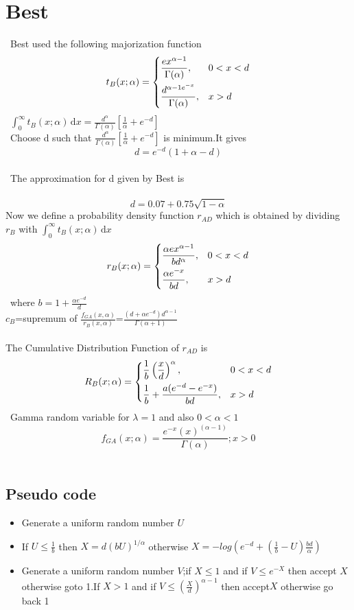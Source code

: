 \documentclass[11pt]{article}
\begin{document}
\section{Best}
\ Best used the following majorization function\\
\[
t_{B}(x;\alpha)=
\begin{dcases}
\frac{e x^{\alpha-1}}{\Gamma(\alpha)}, & 0<x<d \\
\frac{d^{\alpha-1e^{-x}}}{\Gamma(\alpha)}, & x>d
\end{dcases}
\]
\ $\int_0^\infty t_{B}(x;\alpha)\,\mathrm{d}x=\frac{d^{\alpha}}{\Gamma(\alpha)}\left[\frac{1}{\alpha}+e^{-d}\right]$\\
\ Choose d such that $\frac{d^{\alpha}}{\Gamma(\alpha)}\left[\frac{1}{\alpha}+e^{-d}\right]$ is minimum.It gives $$d=e^{-d}(1+\alpha-d)$$\\
\ The approximation for d given by Best is\\
\ $$d=0.07+0.75\sqrt{1-\alpha}$$
Now  we define a probability density function $r_{AD}$ which is obtained by dividing $r_{B}$ with $\int_0^\infty t_{B}(x;\alpha)\,\mathrm{d}x$
\[
r_{B}(x;\alpha)=
\begin{dcases}
\frac{\alpha e x^{\alpha-1}}{bd^{\alpha}}, & 0<x<d \\
\frac{\alpha e^{-x}}{bd}, & x>d
\end{dcases}
\]
\ where $b=1+\frac{\alpha e^{-d}}{d}$\\$c_{B}$=supremum of $\frac{f_{GA}(x,\alpha)}{r_{B}(x,\alpha)}$=$\frac{(d+\alpha e^{-d})d^{\alpha-1}}{\Gamma(\alpha+1)}$\\\\
The Cumulative Distribution Function of $r_{AD}$ is\\
\[
R_{B}(x;\alpha)=
\begin{dcases}
\frac{1}{b}\left(\frac{x}{d}\right)^{\alpha}, & 0<x<d \\
\frac{1}{b}+\frac{a(e^{-d}-e^{-x})}{bd}, & x>d
\end{dcases}
\]
\ Gamma random variable for $\lambda=1$ and also $0<\alpha<1$\\

$$f_{GA}(x;\alpha)=
\frac{e^{- x}( x)^{(\alpha-1)}}{\Gamma(\alpha)};x>0$$ \\
\subsection{Pseudo code}
\begin{itemize}
\item Generate a uniform random number $U$
\item If $U\leq\frac{1}{b}$ then $X=d(bU)^{1/\alpha}$ otherwise $X=-log(e^{-d}+(\frac{1}{b}-U)\frac{bd}{\alpha})$
\item Generate a uniform random number $V$;if $X\leq 1$  and if $V\leq e^{-X}$ then accept $X$ otherwise goto 1.If $X>1$ and if $V\leq \left(\frac{X}{d}\right)^{\alpha-1}$ then accept$X$ otherwise go back 1
\end{itemize}
\end{document}

